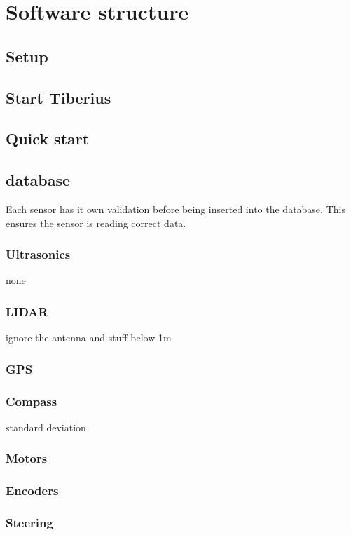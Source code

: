 \section{Software structure}
\pagestyle{aidan}

\subsection{Setup}

\subsection{Start Tiberius}

\subsection{Quick start}

\subsection{database}

Each sensor has it own validation before being inserted into the database. This ensures the sensor is reading correct data.

\subsubsection{Ultrasonics}
none


\subsubsection{LIDAR}
ignore the antenna and stuff below 1m

\subsubsection{GPS}


\subsubsection{Compass}
standard deviation

\subsubsection{Motors}

\subsubsection{Encoders}

\subsubsection{Steering}





